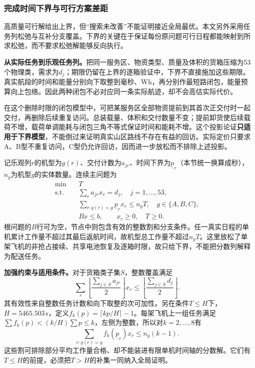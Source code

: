 \subsubsection{完成时间下界与可行方案差距}
\label{sec:q2_bound_derivation}
高质量可行解给出上界，但“搜索未改善”不能证明接近全局最优。本文另外采用任务列松弛与互补分支覆盖\cite{barnhart1998branchprice}。下界的关键在于保证每份原问题可行日程都能映射到所求松弛，而不要求松弛解能够反向执行。

\textbf{从实际任务到乐观任务列。}把同一服务区、物资类型、质量及体积的货箱压缩为53个物理类，需求为$d_j$；期限仍留在上界的逐箱验证中，下界不直接施加这些期限。真实航段的时间和能量分别向下取整到毫秒、Wh，再分别作最短路闭包，能量预算向上包络。因此两种闭包不必对应同一条实际航迹，却不会高估实际代价。

在这个删除时限的闭包模型中，可把某服务区全部物资提前到其首次正交付时一起交付，再删除后续重复访问。总装载量、体积和交付数量不变；提前卸货使后续载荷不增，载荷单调能耗与闭包三角不等式保证时间和能耗不增。这个投影论证\textbf{只适用于下界模型}，不能倒过来证明真实山区路线不存在有益的回访。实际定价只要求A、B型不重复访问，C型仍允许回访，因而进一步放松而不排除上述投影。

记乐观列$r$的机型为$g(r)$、交付计数为$a_{jr}$、时间下界为$\underline p_r$（本节统一换算成秒），$n_g$为机型$g$的实体数量。连续主问题为
\begin{equation}
\begin{aligned}
 \min\quad &T\\
 \mathrm{s.t.}\quad&\sum_ra_{jr}x_r=d_j,\quad j=1,\ldots,53,\\
 &\sum_{r:g(r)=g}\underline p_rx_r\le n_gT,\quad g\in\{A,B,C\},\\
 &Bx\le b,\qquad x_r\ge0,\quad T\ge0.
\end{aligned}
\label{eq:q2_relaxed_master}
\end{equation}
根问题的$B$行可为空，节点中则包含有效的整数割和分支条件。任一真实日程的单机累计工作量不超过其最后返航时间，故机型总工作量不超过$n_gT$。这里放松了单架飞机的非抢占接续、共享电池恢复及逐箱时限，故只给下界，不能把分数列解释为配送任务。

\textbf{加强约束与适用条件。}对于货箱类子集$S$，整数覆盖满足
\begin{equation}
 \sum_r\left\lfloor\frac{\sum_{j\in S}a_{jr}}2\right\rfloor x_r
 \le\left\lfloor\frac{\sum_{j\in S}d_j}2\right\rfloor .
 \label{eq:q2_subset_cut}
\end{equation}
其有效性来自整数任务计数和向下取整的次可加性。另在条件$T\le H$下，$H=5465.503$\,s，定义$f_k(p)=\lceil kp/H\rceil-1$。每架飞机上一组任务满足$\sum f_k(p)<(k/H)\sum p\le k$，左侧为整数，所以对$k=2,\ldots,8$有
\begin{equation}
 \sum_{r:g(r)=g}f_k(\underline p_r)x_r\le n_g(k-1).
 \label{eq:q2_packing_cut}
\end{equation}
这些割可排除部分平均工作量合格、却不能装进有限单机时间轴的分数解。它们有$T\le H$的前提，必须把$T>H$的补集一同纳入全局证明。


